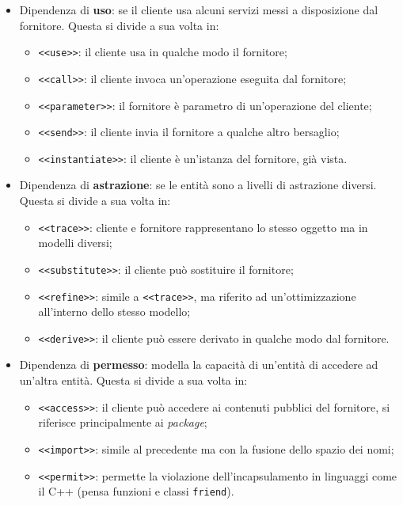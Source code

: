 \documentclass[a4paper,11pt]{article}
\begin{document}
\begin{itemize}
	\item Dipendenza di \textbf{uso}: se il cliente usa alcuni servizi messi a disposizione dal fornitore. Questa si divide a sua volta in:
		\begin{itemize}
			\item \lstinline|<<use>>|: il cliente usa in qualche modo il fornitore;
			\item \lstinline|<<call>>|: il cliente invoca un'operazione eseguita dal fornitore;
			\item \lstinline|<<parameter>>|: il fornitore è parametro di un'operazione del cliente;
			\item \lstinline|<<send>>|: il cliente invia il fornitore a qualche altro bersaglio;
			\item \lstinline|<<instantiate>>|: il cliente è un'istanza del fornitore, già vista.
		\end{itemize}	
	\item Dipendenza di \textbf{astrazione}: se le entità sono a livelli di astrazione diversi. Questa si divide a sua volta in:
		\begin{itemize}
			\item \lstinline|<<trace>>|: cliente e fornitore rappresentano lo stesso oggetto ma in modelli diversi;
			\item \lstinline|<<substitute>>|: il cliente può sostituire il fornitore;
			\item \lstinline|<<refine>>|: simile a \lstinline|<<trace>>|, ma riferito ad un'ottimizzazione all'interno dello stesso modello;
			\item \lstinline|<<derive>>|: il cliente può essere derivato in qualche modo dal fornitore.
		\end{itemize}
	\item Dipendenza di \textbf{permesso}: modella la capacità di un’entità di accedere ad un’altra entità. Questa si divide a sua volta in:
		\begin{itemize}
			\item \lstinline|<<access>>|: il cliente può accedere ai contenuti pubblici del fornitore, si riferisce principalmente ai \textit{package};
			\item \lstinline|<<import>>|: simile al precedente ma con la fusione dello spazio dei nomi;
			\item \lstinline|<<permit>>|: permette la violazione dell'incapsulamento in linguaggi come il C++ (pensa funzioni e classi \lstinline|friend|).
		\end{itemize}
\end{itemize}
\end{document}
